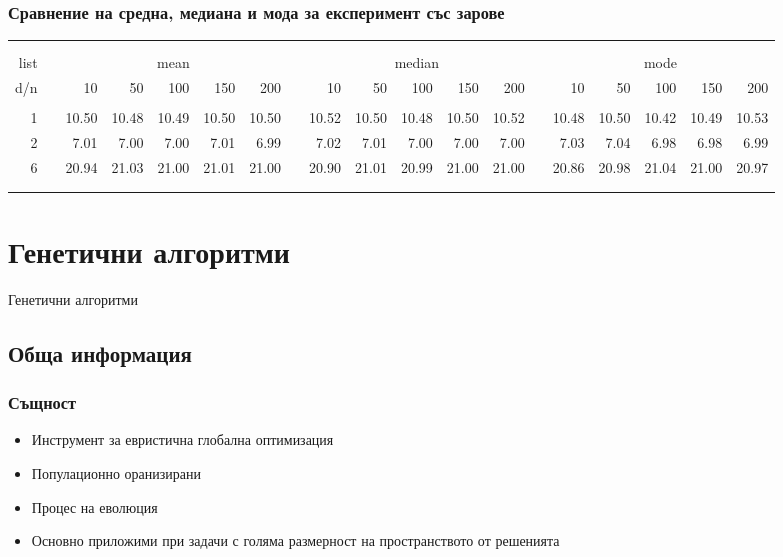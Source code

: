 \documentclass{beamer}
\begin{document}
\begin{frame}
\frametitle{Сравнение на средна, медиана и мода за експеримент със зарове}
\begin{table}[ht]
\centering\tiny
\begin{tabular}{ rrrrrrrrrrrrrrrrrrr }
\hline\hline\\\\
 list && \multicolumn{ 5 }{c}{ mean } &  & \multicolumn{ 5 }{c}{ median } &  & \multicolumn{ 5 }{c}{ mode } \\ 
d/n &  & 10 & 50 & 100 & 150 & 200 &  & 10 & 50 & 100 & 150 & 200 &  & 10 & 50 & 100 & 150 & 200 \\ 
 &  &  &  &  &  &  &  &  &  &  &  &  &  &  &  &  &  &  \\ 
1 &  & 10.50 & 10.48 & 10.49 & 10.50 & 10.50 &  & 10.52 & 10.50 & 10.48 & 10.50 & 10.52 &  & 10.48 & 10.50 & 10.42 & 10.49 & 10.53 \\ 
2 &  &  7.01 &  7.00 &  7.00 &  7.01 &  6.99 &  &  7.02 &  7.01 &  7.00 &  7.00 &  7.00 &  &  7.03 &  7.04 &  6.98 &  6.98 &  6.99 \\ 
6 &  & 20.94 & 21.03 & 21.00 & 21.01 & 21.00 &  & 20.90 & 21.01 & 20.99 & 21.00 & 21.00 &  & 20.86 & 20.98 & 21.04 & 21.00 & 20.97 \\ 
\\
\\
\hline\hline
\end{tabular}
\end{table}
\end{frame}

\section{Генетични алгоритми}

\begin{frame}
\center \huge{Генетични алгоритми}
\end{frame}

\subsection{Обща информация}

\begin{frame}
\frametitle{Същност}
\begin{itemize}
	\item Инструмент за евристична глобална оптимизация
	
	\item Популационно оранизирани
	
	\item Процес на еволюция

	\item Основно приложими при задачи с голяма размерност на пространството от решенията
\end{itemize}
\end{frame}
\end{document}
